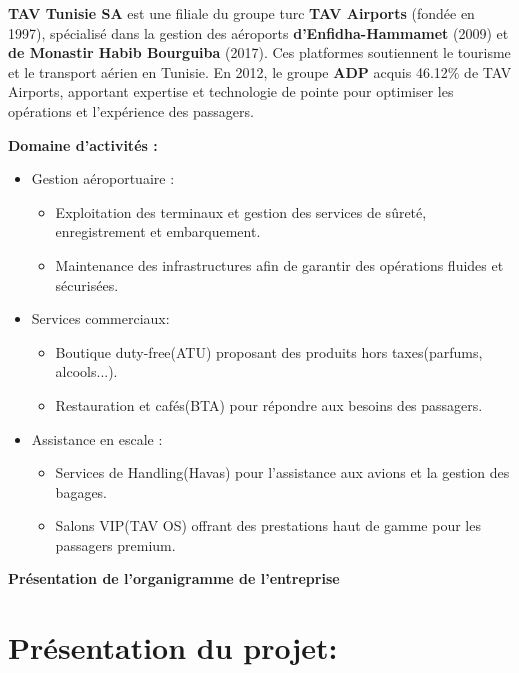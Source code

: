 \documentclass[a4paper,11pt]{report}
\begin{document}
\textbf{TAV Tunisie SA} est une filiale du groupe turc\textbf{ TAV Airports} (fondée en 1997), spécialisé dans la gestion des aéroports \textbf{d'Enfidha-Hammamet} (2009) et \textbf{de Monastir Habib Bourguiba} (2017).
Ces platformes soutiennent le tourisme et le transport aérien en Tunisie.
En 2012, le groupe \textbf{ADP} acquis 46.12\% de TAV Airports, apportant expertise et technologie de pointe pour optimiser les opérations et l'expérience des passagers.

\textbf{Domaine d'activités :} 

\begin{itemize}
\item Gestion aéroportuaire :
	\begin{itemize}
	\item Exploitation des terminaux et gestion des services de sûreté, enregistrement et embarquement.
	\item Maintenance des infrastructures afin de garantir des opérations fluides et sécurisées.
	\end{itemize}
	
\item Services commerciaux:
	\begin{itemize}
		\item Boutique duty-free(ATU) proposant des produits hors taxes(parfums, alcools...).
		\item Restauration et cafés(BTA) pour répondre aux besoins des passagers.
	\end{itemize}

	\item Assistance en escale :
	\begin{itemize}
	\item Services de Handling(Havas) pour l'assistance aux avions et la gestion des bagages.
	\item Salons VIP(TAV OS) offrant des prestations haut de gamme pour les passagers premium.
	\end{itemize}
\end{itemize}

\textbf{Présentation de l'organigramme de l'entreprise}



\newpage
\section{Présentation du projet: }
\end{document}
